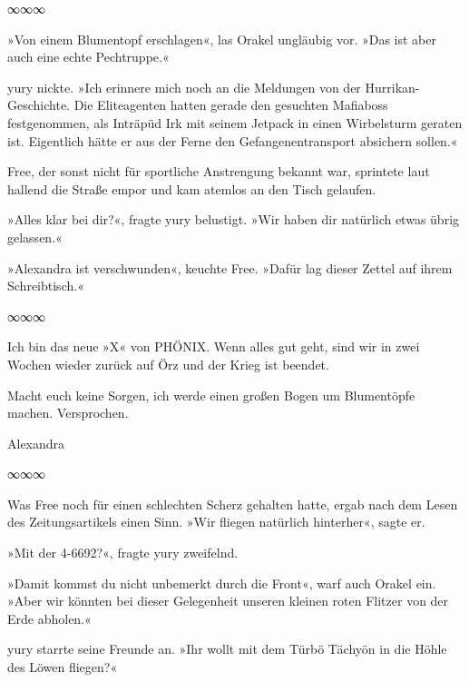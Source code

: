 \begin{itshape}
\end{itshape}

\begin{center}
∞∞∞
\end{center}

»Von einem Blumentopf erschlagen«, las Orakel ungläubig vor. »Das ist aber auch eine echte Pechtruppe.«

yury nickte. »Ich erinnere mich noch an die Meldungen von der Hurrikan-Geschichte. Die Eliteagenten hatten gerade den gesuchten Mafiaboss festgenommen, als Inträpüd Irk mit seinem Jetpack in einen Wirbelsturm geraten ist. Eigentlich hätte er aus der Ferne den Gefangenentransport absichern sollen.«

Free, der sonst nicht für sportliche Anstrengung bekannt war, sprintete laut hallend die Straße empor und kam atemlos an den Tisch gelaufen.

»Alles klar bei dir?«, fragte yury belustigt. »Wir haben dir natürlich etwas übrig gelassen.«

»Alexandra ist verschwunden«, keuchte Free. »Dafür lag dieser Zettel auf ihrem Schreibtisch.«

\begin{center}
∞∞∞
\end{center}

    \begin{itshape}

Ich bin das neue »X« von PHÖNIX. Wenn alles gut geht, sind wir in zwei Wochen wieder zurück auf Örz und der Krieg ist beendet.

Macht euch keine Sorgen, ich werde einen großen Bogen um Blumentöpfe machen. Versprochen.

Alexandra

    \end{itshape}

\begin{center}
∞∞∞
\end{center}

Was Free noch für einen schlechten Scherz gehalten hatte, ergab nach dem Lesen des Zeitungsartikels einen Sinn. »Wir fliegen natürlich hinterher«, sagte er.

»Mit der 4-6692?«, fragte yury zweifelnd.

»Damit kommst du nicht unbemerkt durch die Front«, warf auch Orakel ein. »Aber wir könnten bei dieser Gelegenheit unseren kleinen roten Flitzer von der Erde abholen.«

yury starrte seine Freunde an. »Ihr wollt mit dem Türbö Tächyön in die Höhle des Löwen fliegen?«

